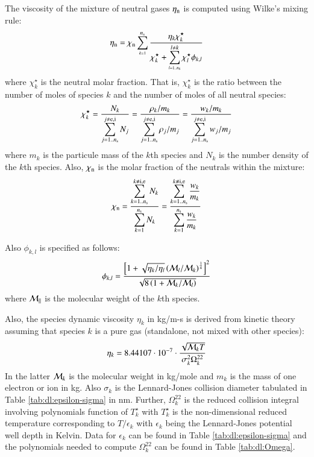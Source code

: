 \documentclass{warpdoc}
\newcommand{\ns}{{{n}_{\rm s}}}
\newcommand{\mfa}{\scriptscriptstyle}
\newcommand{\mfd}{\displaystyle}
\begin{document}
The viscosity of the mixture of neutral gases $\eta_{\rm n}$ is computed using Wilke's mixing rule:
%
\begin{equation}
\eta_{\rm n}= \mfd \chi_{\rm n} \sum_{\mfa k=1}^{\ns}   \frac{\mfd \eta_k {\chi}_k^\star}
                     {\mfd {\chi}_k^\star +
                          \mfd\sum_{\mfa l=1..\ns}^{l \neq k}{\chi}_l^\star \phi_{k,l}}
\label{eqn:dl:molvisc-mixture}
\end{equation}
%
where $\chi_k^\star$ is the neutral molar fraction. That is, $\chi_k^\star$ is the ratio between the number of moles of species $k$ and the number of moles of all neutral species:
%
\begin{equation}
  \chi_k^\star
  = \frac{N_k}{\mfd\sum_{j=1..\ns}^{j \neq {\rm e,i}} N_j} = \frac{\rho_k/m_k}{\mfd\sum_{j=1..\ns}^{j \neq {\rm e,i}} \rho_j/m_j} 
= \frac{w_k /m_k}{\mfd\sum_{j=1..\ns}^{j \neq {\rm e,i}} w_j /m_j} 
\end{equation}
%
where $m_k$ is the particule mass of the $k$th species and $N_k$ is the number density of the $k$th species. Also, $\chi_{\rm n}$ is the molar fraction of the neutrals within the mixture:
%
\begin{equation}
    \chi_{\rm n}= \frac{\mfd \sum_{k=1..\ns}^{k\neq {\rm i,e}} N_k }{\mfd \sum_{k=1}^\ns N_k}
    =\frac{\mfd \sum_{k=1..\ns}^{k\neq {\rm i,e}} \frac{w_k}{m_k} }{\mfd \sum_{k=1}^\ns \frac{w_k}{m_k}}
\end{equation}



Also $\phi_{k,l}$ is specified as follows:
%
\begin{equation}
\phi_{k,l}=\mfd \frac{ \left[  1 + \sqrt{ \mfd {\eta_k }/{\eta_l }}
                              \left( \mfd {{\cal M}_l}/{{\cal M}_k}  \right)^ \frac{1}{4}  \right]^2}
{ \sqrt{\mfd 8\left(1+\mfd {{\cal M}_k}/{{\cal M}_l}\right)}}
\label{eqn:dl:molvisc-phi}
\end{equation}
%
where $\cal M_k$ is the molecular weight of the $k$th species.

Also, the species dynamic viscosity $\eta_k$ in kg/m-s is
derived from kinetic theory assuming that species $k$ is a pure gas (standalone, not mixed with other species):
%
\begin{equation}
\eta_k= 
\mfd 8.44107 \cdot 10^{-7} \cdot \frac{  \sqrt{{\cal M}_k T}}{\sigma_k^2 \Omega^{22}_k} 
\label{eqn:dl:molvisc-muk1}
\end{equation}
%
In the latter ${\cal M}_k$ is the molecular weight in kg/mole and $m_k$ is the mass of one electron or ion in kg.  Also $\sigma_k$ is the Lennard-Jones collision diameter tabulated in Table \ref{tab:dl:epsilon-sigma} in nm. 
Further, $\Omega^{22}_k$ is the reduced collision integral involving polynomials function of $T^\star_k$ with  $T^\star_k$
 is the non-dimensional reduced temperature corresponding to $T/ \epsilon_k$  with $\epsilon_k$ being the Lennard-Jones potential well depth in Kelvin. Data for $\epsilon_k$ can be found in Table \ref{tab:dl:epsilon-sigma} and the polynomials needed to compute $\Omega_k^{22}$ can be found in Table \ref{tab:dl:Omega}.
 
\end{document}
